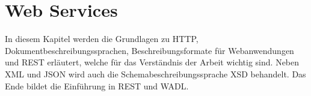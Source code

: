 \chapter{Web Services}
\label{chap:web_services}


In diesem Kapitel werden die Grundlagen zu HTTP, Dokumentbeschreibungssprachen, Beschreibungsformate für Webanwendungen und \gls{REST} erläutert, welche für das Verständnis der Arbeit wichtig sind. 
Neben \gls{XML} und  \gls{JSON} wird auch die Schemabeschreibungssprache \gls{XSD} behandelt.
Das Ende bildet die Einführung in \gls{REST} und \gls{WADL}.











